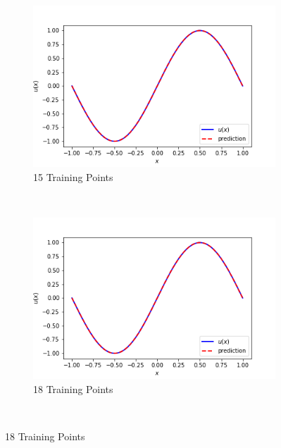 \documentclass{article}
\begin{document}
     \addtocounter{figure}{-1}  
\begin{figure}[htbp]
\center

    \begin{subfigure}{0.45\textwidth}
        \includegraphics[width=\textwidth]{figures/15TrainingPoints}
           \addtocounter{subfigure}{4}  
        \caption{15 Training Points}
    \end{subfigure}
        ~ %
    \begin{subfigure}{0.45\textwidth}
        \includegraphics[width=\textwidth]{figures/18TrainingPoints}
        \caption{18 Training Points}
    \end{subfigure}
~ %

\end{figure}
\end{document}
